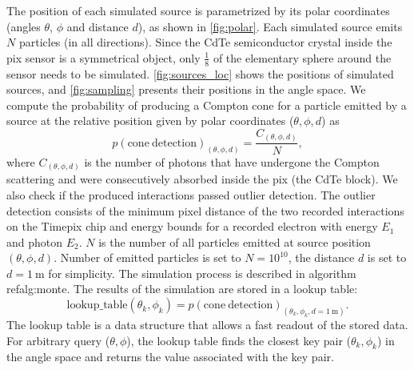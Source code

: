 The position of each simulated source is parametrized by its polar coordinates (angles $\theta$, $\phi$ and distance $d$), as shown in  \autoref{fig:polar}.
Each simulated source emits $N$ particles (in all directions).
Since the \ac{CdTe} semiconductor crystal inside the \ac{pix} sensor is a symmetrical object, only $\frac{1}{8}$ of the elementary sphere around the sensor needs to be simulated.
 \autoref{fig:sources_loc} shows the positions of simulated sources, and  \autoref{fig:sampling} presents their positions in the angle space.
We compute the probability of producing a Compton cone for a particle emitted by a source at the relative position given by polar coordinates ($\theta, \phi, d$) as
\begin{equation}
  p(\mathrm{cone\ detection})_{(\theta, \phi, d)} = \frac{C_{(\theta, \phi, d)}}{N},
\end{equation} 
where $C_{(\theta, \phi, d)}$ is the number of photons that have undergone the Compton scattering and were consecutively absorbed inside the \ac{pix} (the \ac{CdTe} block). 
We also check if the produced interactions passed outlier detection. %
The outlier detection consists of the minimum pixel distance of the two recorded interactions on the Timepix chip and energy bounds for a recorded electron with energy $E_{1}$ and photon $E_{2}$. 
$N$ is the number of all particles emitted at source position $(\theta, \phi, d)$. 
Number of emitted particles is set to $N = 10^{10}$, the distance $d$ is set to $d = \SI{1}\meter$ for simplicity.
The simulation process is described in algorithm ref{alg:monte}. 
The results of the simulation are stored in a lookup table:
\begin{equation}
  \mathrm{lookup\_table}(\theta_{k}, \phi_{k}) = p(\mathrm{cone\ detection})_{(\theta_{k}, \phi_{k}, d = \SI{1}\meter)}. 
\end{equation}
The lookup table is a data structure that allows a fast readout of the stored data.
For arbitrary query ($\theta, \phi$), the lookup table finds the closest key pair ($\theta_{k}, \phi_{k}$) in the angle space and returns the value associated with the key pair.%


